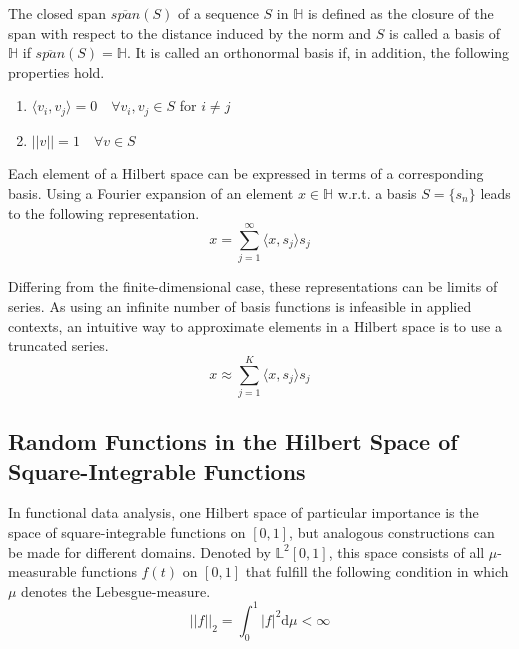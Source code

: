 \documentclass[11pt,twoside,a4paper]{article}
\begin{document}
	The closed span $\overline{span}(S)$ of a sequence $S$ in $\mathbb{H}$ is defined as the closure of the span with respect to the distance induced by the norm and $S$ is called a basis of $\mathbb{H}$ if $\overline{span}(S) = \mathbb{H}$.	It is called an orthonormal basis if, in addition, the following properties hold. 
	\begin{multicols}{2}
		\begin{enumerate}
			\item $\langle v_i, v_j \rangle = 0 \quad \forall v_i, v_j \in S $ for $i \neq j$
			\item $\lvert \lvert v \rvert \rvert = 1 \quad \forall v \in S$
		\end{enumerate}
	\end{multicols}

	Each element of a Hilbert space can be expressed in terms of a corresponding basis. Using a Fourier expansion of an element $x \in \mathbb{H}$ w.r.t. a basis $S = \{s_n\}$ leads to the following representation.
	\begin{equation}
		x = \sum_{j = 1}^{\infty}{\langle x, s_j \rangle}s_j
	\end{equation}
	
	Differing from the finite-dimensional case, these representations can be limits of series. As using an infinite number of basis functions is infeasible in applied contexts, an intuitive way to approximate elements in a Hilbert space is to use a truncated series.
	\begin{equation}
		x \approx \sum_{j = 1}^{K}{\langle x, s_j \rangle}s_j
	\end{equation}
	
	\subsection{Random Functions in the Hilbert Space of Square-Integrable Functions}\label{L_2}
	In functional data analysis, one Hilbert space of particular importance is the space of square-integrable functions on $[0,1]$, but analogous constructions can be made for different domains. Denoted by $\mathbb{L}^2[0,1]$, this space consists of all $\mu$-measurable functions $f(t)$ on $[0,1]$ that fulfill the following condition in which $\mu$ denotes the Lebesgue-measure.
	\begin{equation}
		\lvert \lvert f \rvert \rvert_2 = \int_{0}^{1} \lvert f \rvert^2 \mathrm{d}\mu < \infty
	\end{equation}
	
\end{document}
